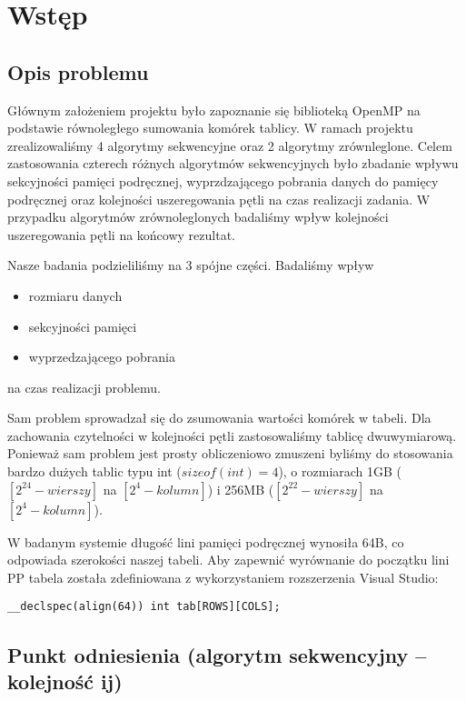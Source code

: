 \section{Wstęp}

\subsection{Opis problemu}

Głównym założeniem projektu było zapoznanie się biblioteką OpenMP na podstawie równoległego sumowania komórek tablicy. W ramach projektu zrealizowaliśmy 4 algorytmy sekwencyjne oraz 2 algorytmy zrównleglone. Celem zastosowania czterech różnych algorytmów sekwencyjnych było zbadanie wpływu sekcyjności pamięci podręcznej, wyprzdzającego pobrania danych do pamięcy podręcznej oraz kolejności uszeregowania pętli na czas realizacji zadania. W przypadku algorytmów zrównoleglonych badaliśmy wpływ kolejności uszeregowania pętli na końcowy rezultat.\newline

Nasze badania podzieliliśmy na 3 spójne części. Badaliśmy wpływ
\begin{itemize}
\item rozmiaru danych
\item sekcyjności pamięci
\item wyprzedzającego pobrania
\end{itemize}
na czas realizacji problemu.\newline

Sam problem sprowadzał się do zsumowania wartości komórek w tabeli. Dla zachowania czytelności w kolejności pętli zastosowaliśmy tablicę dwuwymiarową. Ponieważ sam problem jest prosty obliczeniowo zmuszeni byliśmy do stosowania bardzo dużych tablic typu int ($sizeof(int) = 4$), o rozmiarach 1GB ($[2^{24} - wierszy]$ na $[2^{4} - kolumn]$) i 256MB ($[2^{22} - wierszy]$ na $[2^{4} - kolumn]$).

W badanym systemie długość lini pamięci podręcznej wynosiła 64B, co odpowiada szerokości naszej tabeli. Aby zapewnić wyrównanie do początku lini PP tabela została zdefiniowana z wykorzystaniem rozszerzenia Visual Studio:

\begin{lstlisting}[caption=Definicja tabeli., captionpos=none]
__declspec(align(64)) int tab[ROWS][COLS];
\end{lstlisting}

\subsection{Punkt odniesienia (algorytm sekwencyjny -- kolejność ij)}


